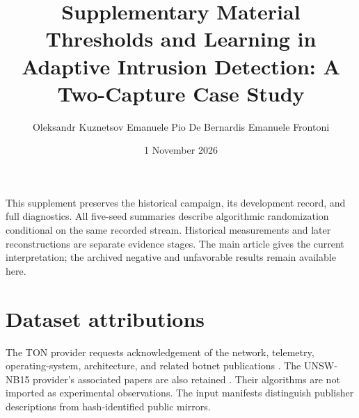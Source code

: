
\renewcommand{\thesection}{S\arabic{section}}
\renewcommand{\thetable}{S\arabic{table}}
\renewcommand{\thefigure}{S\arabic{figure}}
\title{\vspace{-12mm}\textbf{Supplementary Material}\\[5pt]\large Thresholds and Learning in Adaptive Intrusion Detection: A Two-Capture Case Study}
\author{Oleksandr Kuznetsov \quad Emanuele Pio De Bernardis \quad Emanuele Frontoni}
\date{1 November 2026}
\maketitle\thispagestyle{plain}
This supplement preserves the historical campaign, its development record, and full diagnostics. All five-seed summaries describe algorithmic randomization conditional on the same recorded stream. Historical measurements and later reconstructions are separate evidence stages. The main article gives the current interpretation; the archived negative and unfavorable results remain available here.

\FloatBarrier

\FloatBarrier

\FloatBarrier

\FloatBarrier

\FloatBarrier

\section{Dataset attributions}
The TON provider requests acknowledgement of the network, telemetry, operating-system, architecture, and related botnet publications \citep{moustafa2021,booij2022,alsaedi2020,moustafa2020windows,moustafa2020linux,moustafa2019dataset,moustafa2019fog,ashraf2021}. The UNSW-NB15 provider's associated papers are also retained \citep{moustafa2015unsw,moustafa2016unsw,moustafa2019geometry,moustafa2017dirichlet,sarhan2021}. Their algorithms are not imported as experimental observations. The input manifests distinguish publisher descriptions from hash-identified public mirrors.
\begingroup\small\raggedright\endgroup

